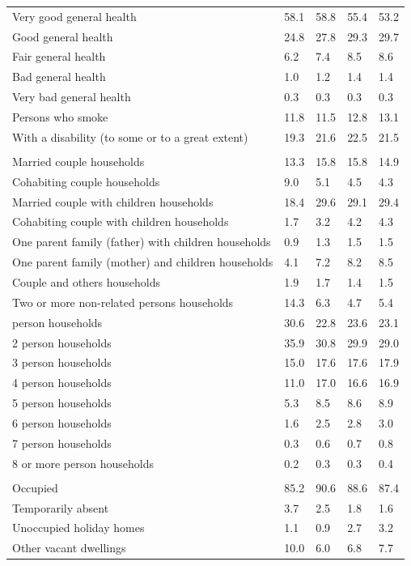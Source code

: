 \documentclass{article}
\begin{document}
\begin{table}[h]
\begin{tabular}{KTTTT}
    \hline
Very good general health & 58.1& 58.8&55.4& 53.2\\
Good general health & 24.8& 27.8& 29.3& 29.7\\
Fair general health & 6.2& 7.4&8.5& 8.6\\
Bad general health & 1.0& 1.2&1.4& 1.4\\
Very bad general health & 0.3& 0.3&0.3& 0.3\\
    \hline
Persons who smoke & 11.8& 11.5&12.8& 13.1\\
    \hline
With a disability (to some or to a great extent) & 19.3& 21.6&22.5& 21.5\\
\hline
    \\ 
    \hline
Married couple households & 13.3& 15.8& 15.8& 14.9\\
Cohabiting couple households & 9.0& 5.1& 4.5& 4.3\\
Married couple with children households & 18.4& 29.6& 29.1& 29.4\\
Cohabiting couple with children households & 1.7& 3.2& 4.2& 4.3\\
One parent family (father) with  children households & 0.9& 1.3& 1.5& 1.5\\
One parent family (mother) and children households & 4.1& 7.2& 8.2& 8.5\\
Couple and others households  & 1.9& 1.7& 1.4& 1.5\\
Two or more non-related persons households & 14.3&  6.3&  4.7&  5.4\\
     person households & 30.6& 22.8& 23.6& 23.1\\
2 person households & 35.9& 30.8& 29.9& 29.0\\
3 person households & 15.0& 17.6& 17.6& 17.9\\
4 person households & 11.0& 17.0& 16.6& 16.9\\
5 person households & 5.3& 8.5& 8.6& 8.9\\
6 person households & 1.6& 2.5& 2.8& 3.0\\
7 person households & 0.3& 0.6& 0.7& 0.8\\
8 or more person households & 0.2& 0.3& 0.3& 0.4\\
\hline
    \\ 
    \hline
Occupied & 85.2& 90.6& 88.6& 87.4\\
Temporarily absent & 3.7& 2.5& 1.8& 1.6\\
Unoccupied holiday homes & 1.1& 0.9& 2.7& 3.2\\
Other vacant dwellings & 10.0&  6.0&  6.8&  7.7\\
\hline
\end{tabular}
\end{table}
\end{document}
